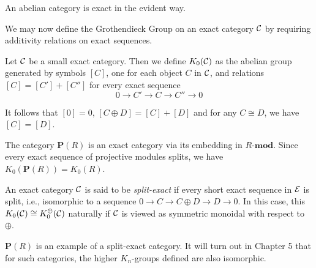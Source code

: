 \begin{example}
An abelian category is exact in the evident way.
\end{example}

We may now define the Grothendieck Group on an exact category $\mathcal{C}$ by requiring
additivity relations on exact sequences.


\begin{definition}
Let $\mathcal{C}$ be a small exact category. Then we define $K_0(\mathcal{C})$
as the abelian group generated by symbols $[C]$, one for each object $C$ in $\mathcal{C}$,
and relations $[C] = [C'] + [C'']$ for every exact sequence
\[
0 \to C' \to C \to C'' \to 0
\]
\end{definition}

It follows that $[0] = 0$, $[C \oplus D] = [C] + [D]$
and for any $C \cong D$, we have $[C] = [D]$.

\begin{example}
The category $\mathbf P(R)$ is an exact category via its embedding in $R$-$\mathbf{mod}$.
Since every exact sequence of projective modules splits, we have
$K_0(\mathbf P(R)) = K_0(R)$.
\end{example}

\begin{definition}
An exact category $\mathcal{C}$ is said to be \emph{split-exact} if every short exact sequence 
in $\mathcal{E}$ is split, i.e., isomorphic to a sequence $0 \to C \to C \oplus D \to D \to 0$. 
In this case, this $K_0(\mathcal{C}) \cong K_0^\oplus(\mathcal{C})$ naturally if $\mathcal{C}$ is viewed as symmetric monoidal with respect to $\oplus$. 
\end{definition}

$\mathbf P(R)$ is an example of a split-exact category. It will turn out in Chapter 5
that for such categories, the higher $K_n$-groups defined are also isomorphic. 




